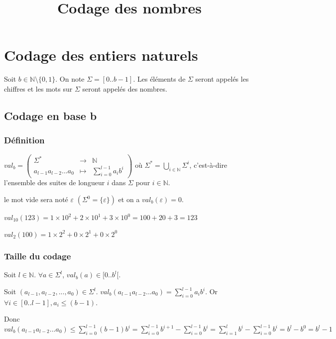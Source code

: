 \documentclass{scrartcl}
\title{Codage des nombres}
\author{}
\date{}
\begin{document}
	\maketitle
	\section{Codage des entiers naturels}

	Soit $b \in \mathbb{N} \setminus \{0,1\}$.
	On note $\Sigma = [0..b-1]$.
	Les éléments de $\Sigma$ seront appelés les chiffres et les mots sur $\Sigma$ seront appelés des nombres.

		\subsection{Codage en base b}

			\subsubsection{Définition}
					
				$val_b = \left( \begin{array}{ccc} \Sigma^* & \to & \mathbb{N} \\ 
				a_{l-1}a_{l-2}...a_0 & \mapsto & \displaystyle \sum_{i=0}^{l-1} a_ib^i \end{array} \right)$
				où $\displaystyle \Sigma^* = \bigcup_{i \in \mathbb{N}} \Sigma^i$, 
				c'est-à-dire l'ensemble des suites de longueur $i$ dans $\Sigma$ pour $i \in \mathbb{N}$.

				\noindent \rem le mot vide sera noté $\varepsilon$ $(\Sigma^0 = \{\varepsilon\})$ et on a $val_b(\varepsilon) = 0$.
				
				\noindent \exemple 
					$val_{10}(123) = 1 \times 10^2 + 2 \times 10^1 + 3 \times 10^0 = 100 + 20 + 3 = 123$
					
					$val_2(100) = 1 \times 2^2 + 0 \times 2^1 + 0 \times 2^0$

			\subsubsection{Taille du codage}
				
				\noindent \lemma Soit $l \in \mathbb{N}$. $\forall a \in \Sigma^l$, $val_b(a) \in [0..b^l[$.
				\begin{demo}
					\item 
						Soit $(a_{l-1},a_{l-2},...,a_0) \in \Sigma^l$. \newline
						$val_b(a_{l-1}a_{l-2}...a_0) = \sum_{i=0}^{l-1} a_ib^i$.
						Or $\forall i \in [0..l-1], a_i \leqslant (b-1)$.
						
						Donc $\displaystyle val_b(a_{l-1}a_{l-2}...a_0) \leqslant \sum_{i=0}^{l-1} (b-1)b^i
						= \sum_{i=0}^{l-1} b^{i+1} - \sum_{i=0}^{l-1} b^i 
						= \sum_{i=1}^l b^i - \sum_{i=0}^{l-1} b^i 
						= b^l - b^0 
						= b^l - 1$
				\end{demo}
\end{document}
